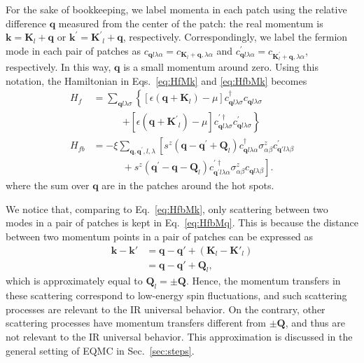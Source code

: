 \documentclass[aps,prx,twocolumn,superscriptaddress,showpacs,floatfix]{revtex4-1}
\begin{document}
For the sake of bookkeeping, we label momenta in each patch using the relative difference $\mathbf{q}$ measured from the center of the patch: the real momentum is $\mathbf{k} = \mathbf{K}_l+\mathbf{q}$ or $\mathbf{k^\prime}=\mathbf{K^\prime}_l+\mathbf{q}$, respectively.
Correspondingly, we label the fermion mode in each pair of patches as $c_{\mathbf{q}l\lambda\alpha} = c_{\mathbf{K}_l+\mathbf{q},\lambda\alpha}$ and $c_{\mathbf{q}l\lambda\alpha}^\prime = c_{\mathbf{K}_l^\prime+\mathbf{q},\lambda\alpha}$, respectively.
In this way, $\mathbf{q}$ is a small momentum around zero.
Using this notation, the Hamiltonian in Eqs.~\eqref{eq:HfMk} and \eqref{eq:HfbMk} becomes
\begin{align}
H_{f} & = \sum_{\mathbf{q}l\lambda\sigma}\left\{
[\epsilon(\mathbf{q} + \mathbf{K}_l)-\mu]
c_{\mathbf{q}l\lambda\sigma}^{\dagger}c_{\mathbf{q}l\lambda\sigma}\right.\nonumber\\
&\quad\quad\quad\left.+[\epsilon(\mathbf{q}+\mathbf{K^\prime}_l)-\mu]
c_{\mathbf{q}l\lambda\sigma}^{\prime\dagger}c_{\mathbf{q}l\lambda\sigma}^\prime\right\}
 \label{eq:HfMq}\\
H_{fb} & = -\xi\sum_{\mathbf{q},\mathbf{q^\prime},l,\lambda}\left[
s^{z}(\mathbf{q}-\mathbf{q^\prime}+\mathbf{Q}_{l})
c_{\mathbf{q}l\lambda\alpha}^\dagger\sigma_{\alpha\beta}^zc_{\mathbf{q'}l\lambda\beta}^\prime
\right.\nonumber\\
&\quad\quad\quad+\left.
s^{z}(\mathbf{q}^\prime-\mathbf{q}-\mathbf{Q}_{l})
c_{\mathbf{q^\prime} l\lambda\alpha}^{\prime\dagger}
\sigma_{\alpha\beta}^zc_{\mathbf{q}l\lambda\beta}\right].
\label{eq:HfbMq}
\end{align}
where the sum over $\mathbf{q}$ are in the patches around the hot spots.

We notice that, comparing to Eq.~\eqref{eq:HfbMk}, only scattering between two modes in a pair of patches is kept in Eq.~\eqref{eq:HfbMq}. This is because the distance between two momentum points in a pair of patches can be expressed as
\begin{align}
\mathbf{k}-\mathbf{k'}&=\mathbf{q}-\mathbf{q'}+(\mathbf{K}_{l}-\mathbf{K'}_{l}) \nonumber\\
&=\mathbf{q}-\mathbf{q'}+\mathbf{Q}_{l},
\end{align}
which is approximately equal to $\mathbf{Q}_l=\pm\mathbf{Q}$.
Hence, the momentum transfers in these scattering correspond to low-energy spin fluctuations, and such scattering processes are relevant to the IR universal behavior.
On the contrary, other scattering processes have momentum transfers different from $\pm \mathbf{Q}$, and thus are not relevant to the IR universal behavior.
This approximation is discussed in the general setting of EQMC in Sec.~\ref{sec:steps}.
\end{document}
